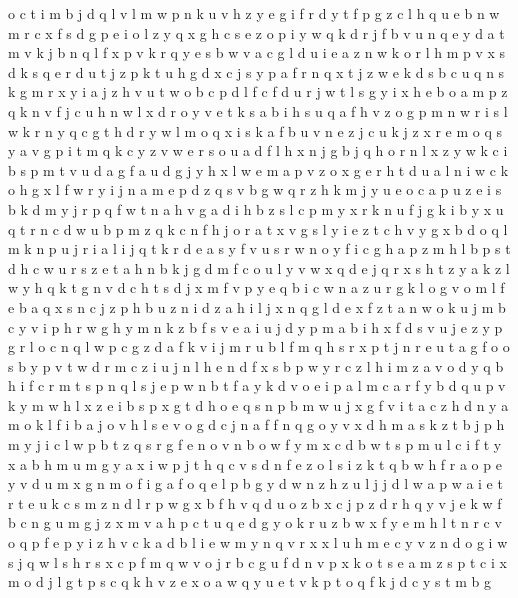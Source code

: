 \documentclass{article}
\begin{document}
o c t i m b j d q l v
l m w p n k u v h z y e g i f
r d y t f p g z c l h q u e
b n w m r c x f s d g p e i o l z y q
x g h c s e z o p i y w q k d r j f b v u n
q e y d a t m v k
j b n q l f x p v k
r q y e s b w v a c g l d u
i e a z n w k o r l h m p v x s d
k s q e r d u t j z
p k t u h g d x c j s
y p a f r n q x t j z w e k d s b c u
q n s k g m r x y i a j z h v u t w o b c p d l f
c f d u r j w t l s g y i x h e b o a m p z q k n v
f j c u h n w l x d r o y v e t k s a b i
h s u
q a f h v z o g p m n w r
i s l w k r n y q c
g t h d r y w l m o q x i s k a f b u v n e z j c
u k j z x r e m o q s y a v g
p i t m q k c y z v w e r s o u a d f l h x n j g b
j q h o r n l x z y w k c i b s p m t v u d a g f
a u d g j y h x l w e
m a p
v z o x g e r h t d u a l n i w
c k o h g x l f w r y i j n a m e p d z q s v b
g w q r z h k m j y u e o c a p
u z e i s b k d m y j r p q f w t n a h
v g a d i h b z s l c p m y x r k n u
f j g k i b y x u q t r n c
d w u b p m z q k c n f h j o r a t x v g s l y i e
z t c h v y g x b d o q l m k n p u j r i a
l i j q t k r d e a s y f
v u s r w n o y f i c g h a p z
m
h
l b p s t d h c w u
r s z e t a h n b k j g d m f c o u l y v w x q
d e j q r x s h t z y a k
z l w y h q k t g n v d c
h t s d j x m f v p y e q b i c w n a z u r g k l o
g v
o m l f e b a q x s n c j z
p h b u z n i d
z a h i l j x n
q g l d e x f z t a n w o k u j m b c y v i p h r
w g h y m n k z b f s v e a i u j
d y p
m a b i h x f d s v u j e z y p g r l o c n q
l w p c g z d a f k v i j m r u b
l f m q h s r x p t j
n r e u t a g f
o
o s b y p v t w d r m c z i u j n l h e
n d f x s b p w y r c z l h i m
z a v o d y q b h i f c r m t s p n
q l s j e p w n b t f a y k d v
o e i p a l m c
a r f y b
d q u p v k y m w h l x z
e i b s p x g t d h
o e q s n p b m w u j x g f v i t a c z h d
n y a m o k
l f i b a j o v h
l s e v o g d c j n a f
f n q g o y v x d h m a s k z t b j p
h m y j i c l w p b t z q s r g f e n o
v n b o w f y m
x c d b w t s p m
u l c i f t y x a b h m
u m g y a x i w p j t h q c v s d n f e z o
l s i z k t q b w h f r a o p e y v d u m x g
n m o f i g a
f o q e l p b g y d w n z
h z u l j
j d l w a p
w a i e t r
t e u k c s m z n d l r p w g x b f h
v
q d u o z b x c j
p z d r h q y v j e k w f b c n g u m
g j z x m v a h p c t
u q e d g y o k r
u z b w x f y e m h l t n r c v o q p
f e p y i z h v
c k a d b l i e w m y n q v r x
x l u h m e c y v z n d o g i w s j q
w l s h r
s x c p f m q w v o j r b
c g u f d n v p x k o t s e a m z
s p t c
i x m o d j l g t p s c q k h v z e
x o a w q y u e t v k p
t o q
f k j d c y s t m b g
\end{document}
